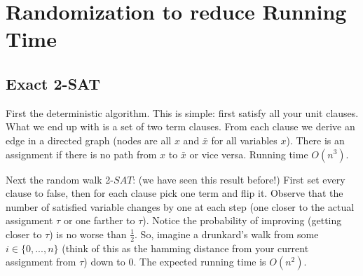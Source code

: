 \documentclass[twoside]{article}
\begin{document}
\section{Randomization to reduce Running Time}

\subsection{Exact 2-SAT}
First the deterministic algorithm. This is simple: first satisfy all your unit clauses. What we end up with is a set of two term clauses. From each clause we derive an edge in a directed graph (nodes are all $x$ and $\bar{x}$ for all variables $x$). There is an assignment if there is no path from $x$ to $\bar{x}$ or vice versa. Running time $O(n^3)$. 

Next the random walk 2-$SAT$: (we have seen this result before!) First set every clause to false, then for each clause pick one term and flip it. Observe that the number of satisfied variable changes by one at each step (one closer to the actual assignment $\tau$ or one farther to $\tau$). Notice the probability of improving (getting closer to $\tau$) is no worse than $\frac{1}{2}$. So, imagine a drunkard's walk from some $i \in \{0, ..., n\}$ (think of this as the hamming distance from your current assignment from $\tau$) down to $0$. The expected running time is $O(n^2)$. 
\end{document}
